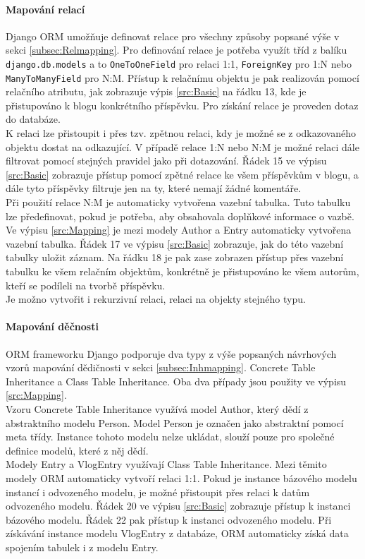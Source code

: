 \documentclass[ing,male,java,dept456]{diploma}						%
\begin{document}
\paragraph{Mapování relací} Django ORM umožňuje definovat relace pro všechny způsoby popsané výše v sekci \ref{subsec:Relmapping}. Pro definování relace je potřeba využít tříd z balíku \lstinline[style=custompython]|django.db.models| a to \lstinline[style=custompython]|OneToOneField| pro relaci 1:1, \lstinline[style=custompython]|ForeignKey| pro 1:N nebo \lstinline[style=custompython]|ManyToManyField| pro N:M. Přístup k relačnímu objektu je pak realizován pomocí relačního atributu, jak zobrazuje výpis \ref{src:Basic} na řádku 13, kde je přistupováno k blogu konkrétního příspěvku. Pro získání relace je proveden dotaz do databáze. \\
K relaci lze přistoupit i přes tzv. zpětnou relaci, kdy je možné se z odkazovaného objektu dostat na odkazující. V případě relace 1:N nebo N:M je možné relaci dále filtrovat pomocí stejných pravidel jako při dotazování. Řádek 15 ve výpisu \ref{src:Basic} zobrazuje přístup pomocí zpětné relace ke všem příspěvkům v blogu, a dále tyto příspěvky filtruje jen na ty, které nemají žádné komentáře.\\
Při použití relace N:M je automaticky vytvořena vazební tabulka. Tuto tabulku lze předefinovat, pokud je potřeba, aby obsahovala doplňkové informace o vazbě. Ve výpisu \ref{src:Mapping} je mezi modely Author a Entry automaticky vytvořena vazební tabulka. Řádek 17 ve výpisu \ref{src:Basic} zobrazuje, jak do této vazební tabulky uložit záznam. Na řádku 18 je pak zase zobrazen přístup přes vazební tabulku ke všem relačním objektům, konkrétně je přistupováno ke všem autorům, kteří se podíleli na tvorbě příspěvku. \\
Je možno vytvořit i rekurzivní relaci, relaci na objekty stejného typu. \\

\paragraph{Mapování děčnosti}

ORM frameworku Django podporuje dva typy z výše popsaných návrhových vzorů mapování dědičnosti v sekci \ref{subsec:Inhmapping}. Concrete Table Inheritance a Class Table Inheritance. Oba dva případy jsou použity ve výpisu \ref{src:Mapping}. \\
Vzoru Concrete Table Inheritance využívá model Author, který dědí z abstraktního modelu Person. Model Person je označen jako abstraktní pomocí meta třídy. Instance tohoto modelu nelze ukládat, slouží pouze pro společné definice modelů, které z něj dědí. \\
Modely Entry a VlogEntry využívají Class Table Inheritance. Mezi těmito modely ORM automaticky vytvoří relaci 1:1. Pokud je instance bázového modelu instancí i odvozeného modelu, je možné přistoupit přes relaci k datům odvozeného modelu. Řádek 20 ve výpisu \ref{src:Basic} zobrazuje přístup k instanci bázového modelu. Řádek 22 pak přístup k instanci odvozeného modelu. Při získávání instance modelu VlogEntry z databáze, ORM automaticky získá data spojením tabulek i z modelu Entry.
\end{document}
